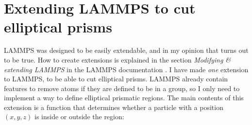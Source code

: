 \section{Extending LAMMPS to cut elliptical prisms}
\label{subsec:reg_eprism}
LAMMPS was designed to be easily extendable, and in my opinion that turns out to be true. How to create extensions is explained in the section \emph{Modifying \& extending LAMMPS} in the LAMMPS documentation \cite{lammps:documentation}. I have made \emph{one} extension to LAMMPS, to be able to cut elliptical prisms. LAMMPS already contain features to remove atoms if they are defined to be in a group, so I only need to implement a way to define elliptical prismatic regions. The main contents of this extension is a function that determines whether a particle with a position $(x, y, z)$ is inside or outside the region:

